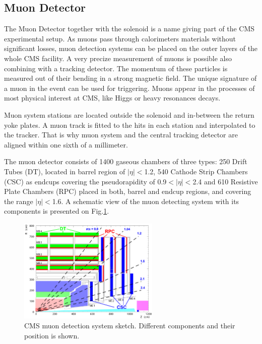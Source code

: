 \subsection{Muon Detector}\label{ssec:muonDet}

The Muon Detector\cite{CMSatLHC} together with the solenoid is a name giving part of the CMS experimental setup. As muons pass through calorimeters materials
without significant losses\cite{MuonStop}, muon detection systems can be placed on the outer layers of the whole CMS facility. A very precize measurement of muons 
is possible also combining with a tracking detector. The momentum of these particles is measured out of their bending in a strong magnetic field.
The unique signature of a muon in the event can be used for triggering. Muons appear in the processes
of most physical interest at CMS, like Higgs or heavy resonances decays.

Muon system stations are located outside the solenoid and in-between the return yoke plates. A muon track is fitted to the hits in each station 
and interpolated to the tracker. That is why muon system and the central tracking detector are aligned within one sixth of a millimeter.

The muon detector consists of 1400 gaseous chambers of three types: 250 Drift Tubes (DT), located in barrel region of $|\eta| < $1.2, 540 Cathode Strip Chambers
(CSC) as endcups covering the pseudorapidity of 0.9$ < |\eta| < $2.4 and 610 Resistive Plate Chambers (RPC) placed in both, barrel and endcup regions, and covering
the range $|\eta| < $1.6. A schematic view of the muon detecting system with its components is presented on Fig.\ref{fig:muond}.

\begin{figure}[t]
  \centering
  \includegraphics[width=0.6\textwidth]{02_experimental_setup/plots/Figures_Experimental_Apparatus_MuonDetector.png}
  \caption{CMS muon detection system sketch. Different components and their position is shown.}
  \label{fig:muond}
\end{figure}

